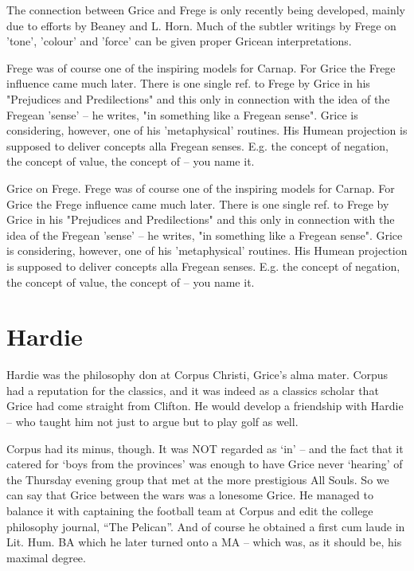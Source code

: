 \documentclass[10pt,titlepage]{book}
\begin{document}
The connection between Grice and Frege is only recently being  
developed, mainly due to efforts by Beaney and L. Horn. Much of the subtler  
writings by Frege on 'tone', 'colour' and 'force' can be given proper Gricean  
interpretations.
 
Frege was of course one of the inspiring models for Carnap. For  Grice 
the Frege influence came much later. There is one single ref. to Frege by  
Grice in his "Prejudices and Predilections" and this only in connection with 
the  idea of the Fregean 'sense' -- he writes, "in something like a Fregean 
sense".  Grice is considering, however, one of his 'metaphysical' routines. 
His Humean  projection is supposed to deliver concepts alla Fregean senses. 
E.g. the concept  of negation, the concept of value, the concept of -- you 
name it.


Grice  on Frege. Frege was of course one of the inspiring models for 
Carnap. For  Grice the Frege influence came much later. There is one single ref. 
to Frege by  Grice in his "Prejudices and Predilections" and this only in 
connection with the  idea of the Fregean 'sense' -- he writes, "in something 
like a Fregean sense".  Grice is considering, however, one of his 
'metaphysical' routines. His Humean  projection is supposed to deliver concepts alla 
Fregean senses. E.g. the concept  of negation, the concept of value, the 
concept of -- you name  it. 


\section{Hardie}

Hardie was the philosophy don at Corpus Christi, Grice's alma mater.  
Corpus had a reputation for the classics, and it was indeed as a classics  
scholar that Grice had come straight from Clifton. He would develop a 
friendship  with Hardie -- who taught him not just to argue but to play golf as 
well.

Corpus had its minus, though.
It was NOT regarded as `in' -- and the fact that it catered for `boys from the provinces' was enough to have Grice never  `hearing' of the Thursday evening group that met at the more prestigious All Souls.
So we can say that Grice between the wars was a lonesome Grice.
He managed to balance it with captaining the football team at Corpus and edit the  college philosophy journal, ``The Pelican''.
And of course he obtained a first cum laude in Lit. Hum. BA which he later turned onto a MA -- which was, as it should  be, his maximal degree.
\end{document}
